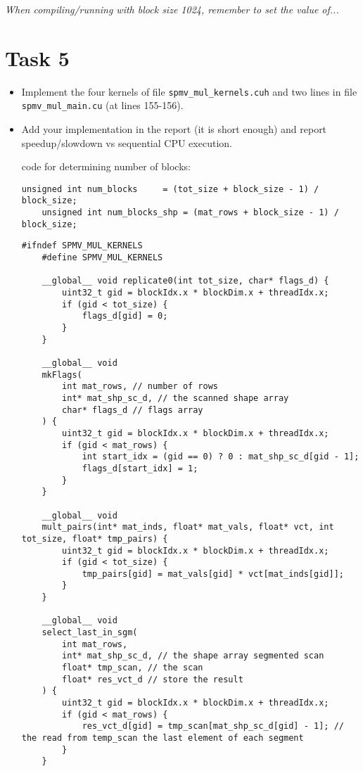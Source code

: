 \documentclass{article}
\begin{document}
\textit{When compiling/running with block size 1024, remember to set the value of...}

\section{Task 5}

\begin{itemize}
  \item Implement the four kernels of file \texttt{spmv\_mul\_kernels.cuh} and two lines in file \texttt{spmv\_mul\_main.cu} (at lines 155-156).
  \item Add your implementation in the report (it is short enough) and report speedup/slowdown vs sequential CPU execution.
  
  code for determining number of blocks:
  
  \begin{lstlisting}[language=cuda]
    unsigned int num_blocks     = (tot_size + block_size - 1) / block_size;
    unsigned int num_blocks_shp = (mat_rows + block_size - 1) / block_size;  
  \end{lstlisting}

  \begin{lstlisting}[language=cuda]
    #ifndef SPMV_MUL_KERNELS
    #define SPMV_MUL_KERNELS

    __global__ void replicate0(int tot_size, char* flags_d) {
        uint32_t gid = blockIdx.x * blockDim.x + threadIdx.x;
        if (gid < tot_size) {
            flags_d[gid] = 0;
        }
    }

    __global__ void
    mkFlags(
        int mat_rows, // number of rows 
        int* mat_shp_sc_d, // the scanned shape array
        char* flags_d // flags array
    ) {
        uint32_t gid = blockIdx.x * blockDim.x + threadIdx.x;
        if (gid < mat_rows) {
            int start_idx = (gid == 0) ? 0 : mat_shp_sc_d[gid - 1];
            flags_d[start_idx] = 1;
        }
    }

    __global__ void
    mult_pairs(int* mat_inds, float* mat_vals, float* vct, int tot_size, float* tmp_pairs) {
        uint32_t gid = blockIdx.x * blockDim.x + threadIdx.x;
        if (gid < tot_size) {
            tmp_pairs[gid] = mat_vals[gid] * vct[mat_inds[gid]];
        }
    }

    __global__ void
    select_last_in_sgm(
        int mat_rows, 
        int* mat_shp_sc_d, // the shape array segmented scan
        float* tmp_scan, // the scan
        float* res_vct_d // store the result
    ) {
        uint32_t gid = blockIdx.x * blockDim.x + threadIdx.x;
        if (gid < mat_rows) {
            res_vct_d[gid] = tmp_scan[mat_shp_sc_d[gid] - 1]; // the read from temp_scan the last element of each segment
        }
    }


\end{lstlisting}
\end{itemize}
\end{document}
